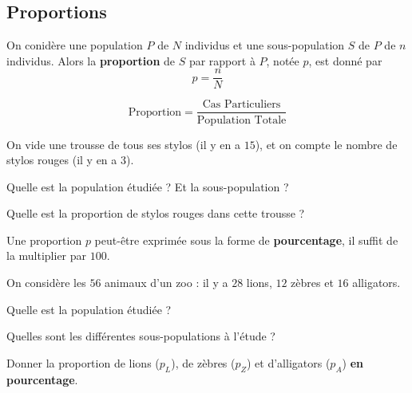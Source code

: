 \documentclass{poly}
\begin{document}
\subsection{Proportions}
\begin{definition}
On conidère une population $P$ de $N$ individus et une sous-population $S$ de $P$ de $n$ individus. Alors la \textbf{proportion} de $S$ par rapport à $P$, notée $p$, est donné par
\begin{equation*}
p = \dfrac{n}{N}
\end{equation*}        
\end{definition}
\begin{remark}
\begin{equation*}
\text{Proportion} = \dfrac{\text{Cas Particuliers}}{\text{Population Totale}}
\end{equation*}
\end{remark}
\begin{exercize*}
On vide une trousse de tous ses stylos (il y en a $15$), et on compte le nombre de stylos rouges (il y en a $3$). 
\begin{alphaquestions}
\item Quelle est la population étudiée ? Et la sous-population ?
\item Quelle est la proportion de stylos rouges dans cette trousse ?
\end{alphaquestions}

\end{exercize*}
\begin{remark}
Une proportion $p$ peut-être exprimée sous la forme de \textbf{pourcentage}, il suffit de la multiplier par $100$.
\end{remark}
\begin{example}
On considère les $56$ animaux d'un zoo : il y a $28$ lions, $12$ zèbres et $16$ alligators.
\begin{alphaquestions}
\item Quelle est la population étudiée ?
\item Quelles sont les différentes sous-populations à l'étude ?
\item Donner la proportion de lions ($p_L$), de zèbres ($p_Z$) et d'alligators ($p_A$) \textbf{en pourcentage}.
\end{alphaquestions}

\end{example}

\end{document}
